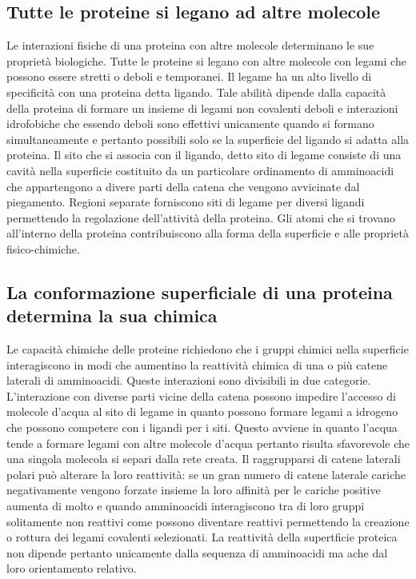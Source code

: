 \subsection{Tutte le proteine si legano ad altre molecole}
Le interazioni fisiche di una proteina con altre molecole determinano le sue propriet\`a biologiche. Tutte le proteine si legano con altre molecole con legami che possono essere stretti
o deboli e temporanei. Il legame ha un alto livello di specificit\`a con una proteina detta ligando. Tale abilit\`a dipende dalla capacit\`a della proteina di formare un insieme di 
legami non covalenti deboli e interazioni idrofobiche che essendo deboli sono effettivi unicamente quando si formano simultaneamente e pertanto possibili solo se la superficie del 
ligando si adatta alla proteina. Il sito che si associa con il ligando, detto sito di legame consiste di una cavit\`a nella superficie costituito da un particolare ordinamento di 
amminoacidi che appartengono a divere parti della catena che vengono avvicinate dal piegamento. Regioni separate forniscono siti di legame per diversi ligandi permettendo la regolazione
dell'attivit\`a della proteina. Gli atomi che si trovano all'interno della proteina contribuiscono alla forma della superficie e alle propriet\`a fisico-chimiche. 
\subsection{La conformazione superficiale di una proteina determina la sua chimica}
Le capacit\`a chimiche delle proteine richiedono che i gruppi chimici nella superficie interagiscono in modi che aumentino la reattivit\`a chimica di una o pi\`u catene laterali di 
amminoacidi. Queste interazioni sono divisibili in due categorie. L'interazione con diverse parti vicine della catena possono impedire l'accesso di molecole d'acqua al sito di legame in
quanto possono formare legami a idrogeno che possono competere con i ligandi per i siti. Questo avviene in quanto l'acqua tende a formare legami con altre molecole d'acqua pertanto 
risulta sfavorevole che una singola molecola si separi dalla rete creata. Il raggrupparsi di catene laterali polari pu\`o alterare la loro reattivit\`a: se un gran numero di catene
laterale cariche negativamente vengono forzate insieme la loro affinit\`a per le cariche positive aumenta di molto e quando amminoacidi interagiscono tra di loro gruppi solitamente 
non reattivi come  possono diventare reattivi permettendo la creazione o rottura dei legami covalenti selezionati. La reattivit\`a della supertficie proteica non dipende 
pertanto unicamente dalla sequenza di amminoacidi ma ache dal loro orientamento relativo. 
